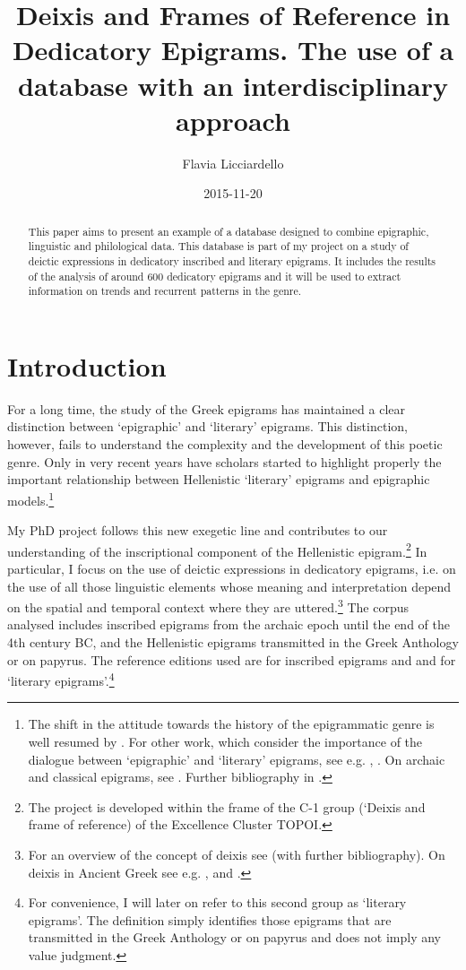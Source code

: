 \documentclass[amsthm,ebook]{saparticle}
\title{Deixis and Frames of Reference in Dedicatory Epigrams. 
The use of a database with an interdisciplinary approach}
\author[topoi]{Flavia Licciardello\corref{first}}
\date{2015-11-20}
\begin{document}
\maketitle
\begin{abstract}
This paper aims to present an example of a database designed to combine epigraphic, linguistic and
philological data. This database is part of my project on a study of deictic expressions in dedicatory inscribed and
literary epigrams. It includes the results of the analysis of around 600 dedicatory epigrams and it will be used to
extract information on trends and recurrent patterns in the genre.
\end{abstract}

\section{Introduction}


\noindent For a long time, the study of the Greek epigrams has maintained a clear distinction between `epigraphic' and `literary'
epigrams. This distinction, however, fails to understand the complexity and the development of this poetic genre. Only
in very recent years have scholars started to highlight properly the important relationship between Hellenistic
`literary' epigrams and epigraphic models.\footnote{ The shift in the attitude towards the history of the epigrammatic
genre is well resumed by \citep[5-34]{garulli_byblos_2012}. For other work, which consider the importance of the dialogue between
`epigraphic' and `literary' epigrams, see e.g. \citep{meyer_inszeniertes_2005}, \citep{tueller_look_2008}. On archaic and classical epigrams, see
\citep{baumbach_archaic_2010}. Further bibliography in \citep[2]{baumbach_archaic_2010}.} 

My PhD project follows this new exegetic line and contributes to our understanding of the inscriptional component of the
Hellenistic epigram.\footnote{ The project is developed within the frame of the C-1 group (`Deixis and frame of
reference) of the Excellence Cluster TOPOI.} In particular, I focus on the use of deictic expressions in dedicatory
epigrams, i.e. on the use of all those linguistic elements whose meaning and interpretation depend on the spatial and
temporal context where they are uttered.\footnote{ For an overview of the concept of deixis see \citep{diessel_deixis_2012} (with
further bibliography). On deixis in Ancient Greek see e.g. \citep{felson_poetics_2004}, \citep{edmunds_deixis_2008} and \citep{bonifazi_deixis_2014}.} The
corpus analysed includes inscribed epigrams from the archaic epoch until the end of the 4th century BC, and the
Hellenistic epigrams transmitted in the Greek Anthology or on papyrus. The reference editions used are \citep[1-2]{hansen_carmina_1983}
for inscribed epigrams and \citep{gow_greek_1965} and \citep{austin_posidippi_2002} for `literary epigrams'.\footnote{ For
convenience, I will later on refer to this second group as `literary epigrams'. The definition simply identifies those
epigrams that are transmitted in the Greek Anthology or on papyrus and does not imply any value judgment.} 
\end{document}
